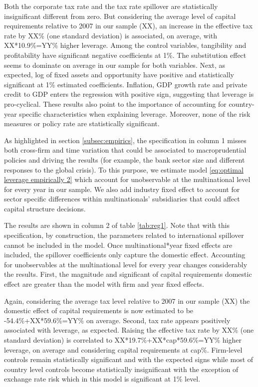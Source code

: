 \documentclass[12pt]{article}
\begin{document}
	 Both the corporate tax rate and the tax rate spillover are statistically insignificant different from zero. But considering the average level of capital requirements relative to 2007 in our sample (XX), an increase in the effective tax rate by XX\% (one standard deviation) is associated, on average, with XX*10.9\%=YY\% higher leverage. Among the control variables, tangibility and profitability have significant negative coefficients at 1\%. The substitution effect seems to dominate on average in our sample for both variables. Next, as expected, log of fixed assets and opportunity have positive and statistically significant at 1\% estimated coefficients. Inflation, GDP growth rate and private credit to GDP enters the regression with positive sign, suggesting that leverage is pro-cyclical. These results also point to the importance of accounting for country-year specific characteristics when explaining leverage. Moreover, none of the risk measures or policy rate are statistically significant. 
	 
	 As highlighted in section \ref{subsec:empirics}, the specification in column 1 misses both cross-firm and time variation that could be associated to macroprudential policies and driving the results (for example, the bank sector size and different responses to the global crisis). To this purpose, we estimate model \ref{eq:optimal leverage empirically 2} which account for unobservable at the multinational level for every year in our sample. We also add industry fixed effect to account for sector specific differences within multinationals' subsidiaries that could affect capital structure decisions. 
	 
	 The results are shown in column 2 of table \ref{tab:reg1}. Note that with this specification, by construction, the parameters related to international spillover cannot be included in the model. Once multinational*year fixed effects are included, the spillover coefficients only capture the domestic effect. Accounting for unobservables at the multinational level for every year changes considerably the results. First, the magnitude and significant of capital requirements domestic effect are greater than the model with firm and year fixed effects. 
	 
	 Again, considering the average tax level relative to 2007 in our sample (XX) the domestic effect of capital requirements is now estimated to be -54.4\%+XX*59.6\%=YY\% on average. Second, tax rate appears positively associated with leverage, as expected. Raising the effective tax rate by XX\% (one standard deviation) is correlated to XX*19.7\%+XX*cap*59.6\%=YY\% higher leverage, on average and considering capital requirements at cap\%. Firm-level controls remain statistically significant and with the expected signs while most of country level controls become statistically insignificant with the exception of exchange rate risk which in this model is significant at 1\% level. 
	 
\end{document}
